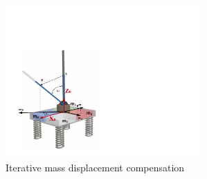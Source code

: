 \begin{figure}[!t]
	\centering
	\includegraphics[width=75mm]{./pictures/IterativeAlgorithm.pdf}
	\caption{Iterative mass displacement compensation}
	\label{fig:imassCom}
\end{figure}









